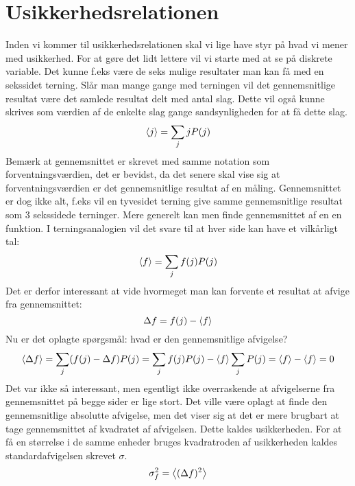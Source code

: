 \documentclass[../Kvantemekanik.tex]{subfiles}
\begin{document}
\section{Usikkerhedsrelationen}

Inden vi kommer til usikkerhedsrelationen skal vi lige have styr på hvad vi mener med usikkerhed.
For at gøre det lidt lettere vil vi starte med at se på diskrete variable. Det kunne f.eks være de seks mulige resultater man kan få med en sekssidet terning.
Slår man mange gange med terningen vil det gennemsnitlige resultat være det samlede resultat delt med antal slag.
Dette vil også kunne skrives som værdien af de enkelte slag gange sandsynligheden for at få dette slag.
\begin{equation}
    \left< j \right> =\sum_j jP(j)
\end{equation}
Bemærk at gennemsnittet er skrevet med samme notation som forventningsværdien, det er bevidst, da det senere skal vise sig at forventningsværdien er det gennemsnitlige resultat af en måling. Gennemsnittet er dog ikke alt, f.eks vil en tyvesidet terning give samme gennemsnitlige resultat som 3 sekssidede terninger.
Mere generelt kan men finde gennemsnittet af en en funktion. I terningsanalogien vil det svare til at hver side kan have et vilkårligt tal:
\begin{equation}
    \left< f \right> = \sum_jf(j)P(j)
\end{equation}
Det er derfor interessant at vide hvormeget man kan forvente et resultat at afvige fra gennemsnittet:
\begin{equation}
    \Delta f = f(j)- \left< f \right>
\end{equation}
Nu er det oplagte spørgsmål: hvad er den gennemsnitlige afvigelse?
\begin{equation}
    \left< \Delta f \right> = \sum_j(f(j)-\Delta f)P(j) = \sum_jf(j)P(j)-\left< f \right>\sum_jP(j) = \left< f \right>-\left< f \right> = 0
\end{equation}
Det var ikke så interessant, men egentligt ikke overraskende at afvigelserne fra gennemsnittet på begge sider er lige stort.
Det ville være oplagt at finde den gennemsnitlige absolutte afvigelse, men det viser sig at det er mere brugbart at tage gennemsnittet af kvadratet af afvigelsen. Dette kaldes usikkerheden. For at få en størrelse i de samme enheder bruges kvadratroden af usikkerheden kaldes standardafvigelsen skrevet $\sigma$.
\begin{equation}
    \sigma_f^2 = \left< (\Delta f)^2 \right>
    \label{kvant:eq:usikkerheddef}
\end{equation}
\end{document}

